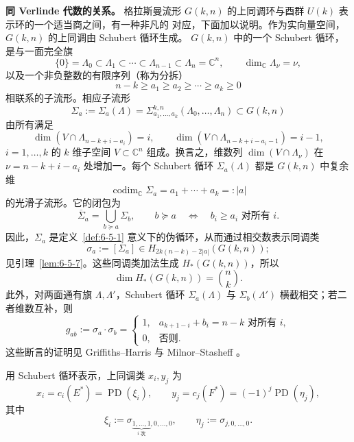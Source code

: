 \medskip
\noindent\textbf{同 Verlinde 代数的关系。}
格拉斯曼流形 $G(k,n)$ 的上同调环与酉群 $U(k)$ 表示环的一个适当商之间，有一种非凡的
对应，下面加以说明。作为实向量空间，$G(k,n)$ 的上同调由 Schubert 循环生成。
$G(k,n)$ 中的一个 Schubert 循环，是与一面完全旗
\[
  \{0\}=\Lambda_0\subset\Lambda_1\subset\cdots\subset
  \Lambda_{n-1}\subset\Lambda_n=\mathbb C^n,
  \qquad \dim_{\mathbb C}\Lambda_\nu=\nu,
\]
以及一个非负整数的有限序列（称为分拆）
\[
  n-k\geq a_1\geq a_2\geq\cdots\geq a_k\geq0
\]
相联系的子流形。相应子流形
\[
  \Sigma_a:=\Sigma_a(\Lambda)=
  \Sigma_{a_1,\ldots,a_k}^{k,n}(\Lambda_0,\ldots,\Lambda_n)
  \subset G(k,n)
\]
由所有满足
\[
  \dim(V\cap\Lambda_{n-k+i-a_i})=i,
  \qquad
  \dim(V\cap\Lambda_{n-k+i-a_i-1})=i-1,
\]
$i=1,\ldots,k$ 的 $k$ 维子空间 $V\subset\mathbb C^n$ 组成。换言之，维数列
$\dim(V\cap\Lambda_\nu)$ 在 $\nu=n-k+i-a_i$ 处增加一。每个 Schubert 循环
$\Sigma_a(\Lambda)$ 都是 $G(k,n)$ 中复余维
\[
  \operatorname{codim}_{\mathbb C}\Sigma_a
  =a_1+\cdots+a_k=:|a|
\]
的光滑子流形。它的闭包为
\[
  \overline\Sigma_a=\bigcup_{b\succeq a}\Sigma_b,
  \qquad b\succeq a\quad\Longleftrightarrow\quad b_i\geq a_i
  \text{ 对所有 }i.
\]
因此，$\Sigma_a$ 是定义~\ref{def:6-5-1} 意义下的伪循环，从而通过相交数表示同调类
\[
  \sigma_a:=[\Sigma_a]
  \in H_{2k(n-k)-2|a|}(G(k,n));
\]
见引理~\ref{lem:6-5-7}。这些同调类加法生成 $H_*(G(k,n))$，所以
\[
  \dim H_*(G(k,n))=\binom nk.
\]
此外，对两面通有旗 $\Lambda,\Lambda'$，Schubert 循环
$\Sigma_a(\Lambda)$ 与 $\Sigma_b(\Lambda')$ 横截相交；若二者维数互补，则
\[
  g_{ab}:=\sigma_a\cdot\sigma_b=
  \begin{cases}
    1,&a_{k+1-i}+b_i=n-k\text{ 对所有 }i,\\
    0,&\text{否则}.
  \end{cases}
\]
这些断言的证明见 Griffiths--Harris  与 Milnor--Stasheff
。

\begin{remark}\label{rem:11-3-16}
用 Schubert 循环表示，上同调类 $x_i,y_j$ 为
\[
  x_i=c_i(E^*)=\operatorname{PD}(\xi_i),
  \qquad
  y_j=c_j(F^*)=(-1)^j\operatorname{PD}(\eta_j),
\]
其中
\[
  \xi_i:=\sigma_{\underbrace{1,\ldots,1}_{i\text{ 次}},0,\ldots,0},
  \qquad
  \eta_j:=\sigma_{j,0,\ldots,0}.
\]
\end{remark}

